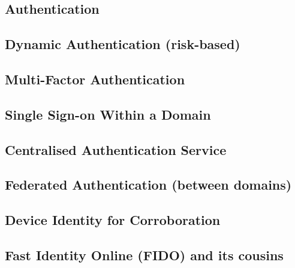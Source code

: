 \hypertarget{authentication-1}{%
\subsection{Authentication}\label{authentication-1}}

\hypertarget{dynamic-authentication-risk-based}{%
\subsection{Dynamic Authentication
(risk-based)}\label{dynamic-authentication-risk-based}}

\hypertarget{multi-factor-authentication}{%
\subsection{Multi-Factor
Authentication}\label{multi-factor-authentication}}

\hypertarget{single-sign-on-within-a-domain}{%
\subsection{Single Sign-on Within a
Domain}\label{single-sign-on-within-a-domain}}

\hypertarget{centralised-authentication-service}{%
\subsection{Centralised Authentication
Service}\label{centralised-authentication-service}}

\hypertarget{federated-authentication-between-domains}{%
\subsection{Federated Authentication (between
domains)}\label{federated-authentication-between-domains}}

\hypertarget{device-identity-for-corroboration}{%
\subsection{Device Identity for
Corroboration}\label{device-identity-for-corroboration}}

\hypertarget{fast-identity-online-fido-and-its-cousins}{%
\subsection{Fast Identity Online (FIDO) and its
cousins}\label{fast-identity-online-fido-and-its-cousins}}

